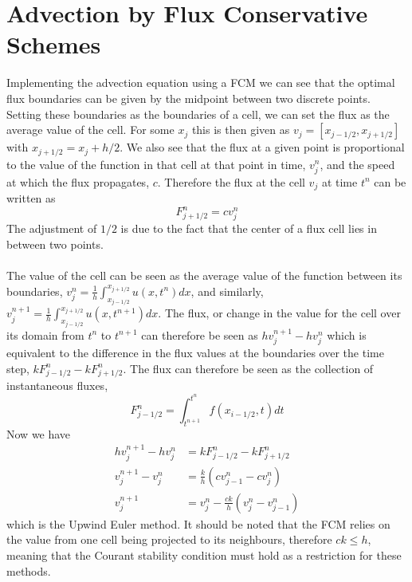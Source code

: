 \section{Advection by Flux Conservative Schemes}
Implementing the advection equation using a FCM we can see that the optimal flux boundaries can be given by the midpoint between two discrete points. Setting these boundaries as the boundaries of a cell, we can set the flux as the average value of the cell. For some $x_j$ this is then given as $v_j=[x_{j-1/2},x_{j+1/2}]$ with $x_{j+1/2} = x_j + h/2$. We also see that the flux at a given point is proportional to the value of the function in that cell at that point in time, $v_j^n$, and the speed at which the flux propagates, $c$. Therefore the flux at the cell $v_j$ at time $t^n$ can be written as
\begin{equation}\label{eq:adv_flux}
  F^n_{j+1/2} =cv^n_j
\end{equation}
The adjustment of $1/2$ is due to the fact that the center of a flux cell lies in between two points.
\\
\\
The value of the cell can be seen as the average value of the function between its boundaries, $v^n_j=\frac{1}{h}\int_{x_{j-1/2}}^{x_{j+1/2}}u(x,t^n)dx$, and similarly, $v^{n+1}_j=\frac{1}{h}\int_{x_{j-1/2}}^{x_{j+1/2}}u(x,t^{n+1})dx$. The flux, or change in the value for the cell over its domain from $t^n$ to $t^{n+1}$ can therefore be seen as $hv^{n+1}_j - hv^n_j$ which is equivalent to the difference in the flux values at the boundaries over the time step, $kF^n_{j-1/2} - kF^n_{j+1/2}$. The flux can therefore be seen as the collection of instantaneous fluxes,
\begin{equation*}
  F^n_{j-1/2} = \int_{t^{n+1}}^{t^n}f(x_{i-1/2},t)dt
\end{equation*}
Now we have
\begin{align}
  hv^{n+1}_j - hv^n_j   &=  kF^n_{j-1/2} - kF^n_{j+1/2}\\
  v^{n+1}_j - v^n_j     &= \frac{k}{h}(cv^n_{j-1} - cv^n_j)\\
  v^{n+1}_j             &= v^n_j - \frac{ck}{h}(v^n_{j} - v^n_{j-1}) \label{eq:flux_upwind}
\end{align}
which is the Upwind Euler method. It should be noted that the FCM relies on the value from one cell being projected to its neighbours, therefore $ck\leq h$, meaning that the Courant stability condition must hold as a restriction for these methods.
